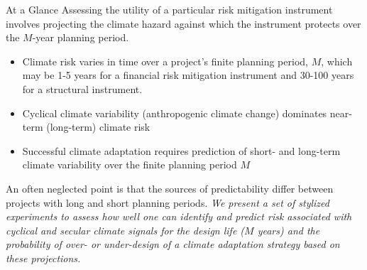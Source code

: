 \begin{block}{At a Glance}
    Assessing the utility of a particular risk mitigation instrument involves projecting the climate hazard against which the instrument protects over the $M$-year planning period.
    \begin{itemize}
        \item Climate risk varies in time over a project’s finite planning period, $M$, which may be 1-5 years for a financial risk mitigation instrument and 30-100 years for a structural instrument.
        \item Cyclical climate variability (anthropogenic climate change) dominates near-term (long-term) climate risk
        \item Successful climate adaptation requires prediction of short- and long-term climate variability over the finite planning period $M$
    \end{itemize}
    An often neglected point is that the sources of predictability differ between projects with long and short planning periods.
    \emph{We present a set of stylized experiments to assess how well one can identify and predict risk associated with cyclical and secular climate signals for the design life ($M$ years) and the probability of over- or under-design of a climate adaptation strategy based on these projections.}
\end{block}
